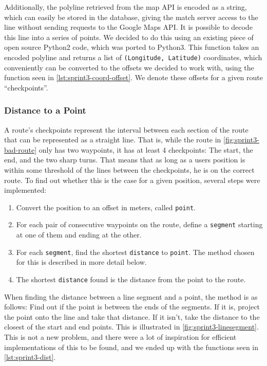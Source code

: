 Additionally, the polyline retrieved from the map API is encoded as a string, which can easily be stored in the database, giving the match server access to the line without sending requests to the Google Maps \ac{API}. It is possible to decode this line into a series of points. We decided to do this using an existing piece of open source Python2 code\cite{decodepolyline}, which was ported to Python3. This function takes an encoded polyline and returns a list of \texttt{(Longitude, Latitude)} coordinates, which conveniently can be converted to the offsets we decided to work with, using the function seen in \autoref{lst:sprint3-coord-offset}. We denote these offsets for a given route ``checkpoints''.

\subsubsection{Distance to a Point}

A route's checkpoints represent the interval between each section of the route that can be represented as a straight line. That is, while the route in \autoref{fig:sprint3-bad-route} only has two waypoints, it has at least 4 checkpoints: The start, the end, and the two sharp turns. That means that as long as a users position is within some threshold of the lines between the checkpoints, he is on the correct route. To find out whether this is the case for a given position, several steps were implemented:

\begin{enumerate}
 \item Convert the position to an offset in meters, called \texttt{point}.
 \item For each pair of consecutive waypoints on the route, define a \texttt{segment} starting at one of them and ending at the other.
 \item For each \texttt{segment}, find the shortest \texttt{distance} to \texttt{point}. The method chosen for this is described in more detail below.
 \item The shortest \texttt{distance} found is the distance from the point to the route.
\end{enumerate}

When finding the distance between a line segment and a point, the method is as follows: Find out if the point is between the ends of the segments. If it is, project the point onto the line and take that distance. If it isn't, take the distance to the closest of the start and end points. This is illustrated in \autoref{fig:sprint3-linesegment}. This is not a new problem, and there were a lot of inspiration for efficient implementations of this to be found\cite{point2line1}\cite{point2line2}, and we ended up with the functions seen in \autoref{lst:sprint3-dist}.


